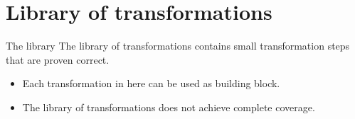 \section{Library of transformations}

\begin{frame}{The library}
    The library of transformations contains small transformation steps that are proven correct.
    \begin{itemize}
        \item Each transformation in here can be used as building block.
        \item The library of transformations does not achieve complete coverage.
    \end{itemize}
\end{frame}


